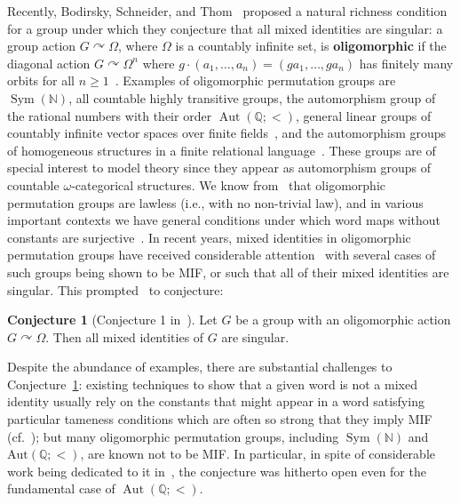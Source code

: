 \documentclass{article}
\theoremstyle{remark}
\theoremstyle{definition}
\newtheorem{conjecture}[theorem]{Conjecture}
\def\acts{\curvearrowright}
\newcommand{\remmic}[1]{\textcolor{orange}{MP: #1}}
\newcommand{\repau}[1]{\textcolor{ForestGreen}{PM: #1}}
\DeclareMathOperator{\Aut}{Aut}
\DeclareMathOperator{\Sym}{Sym}
\DeclareMathOperator{\GL}{GL}
\begin{document}
Recently, Bodirsky, Schneider, and Thom~\cite{bodirsky2024mixed} %
{proposed}
a natural richness condition for a group under which they conjecture that all mixed identities are singular: a {group action}
$G\acts\Omega$, where $\Omega$ is a countably infinite set, is \textbf{oligomorphic} if the diagonal action $G\acts \Omega^n$ where $g\cdot (a_1, \dots, a_n)=(g a_1, \dots, g a_n)$ has finitely many orbits for all $n\geq 1$~\cite{cameron2009oligomorphic}. Examples of oligomorphic permutation groups are $\Sym(\mathbb{N})$, all countable highly transitive groups, the automorphism group of the rational numbers with their order $\Aut(\mathbb{Q}; <)$, general linear groups of countably infinite vector spaces  %
over finite fields~\cite{evans1991small}, and the automorphism groups of homogeneous structures in a finite relational language~\cite{homogeneous}. These groups are of special interest to model theory since they appear as automorphism groups of countable $\omega$-categorical structures. %
We know from~\cite{macpherson1986groups} that oligomorphic permutation groups are lawless (i.e., with no non-trivial law), and in various important contexts we have general 
conditions
 under which word maps without constants are surjective~\cite{adeleke1994representation, mycielski1987representations, lyndon1990words, maroli1990representation}. {In recent years, mixed identities in oligomorphic permutation groups have} received considerable attention~\cite{hull2016transitivity, etedadialiabadi2021dense, ghadernezhad2019group, bradford2023non, bodirsky2024mixed} with several cases %
of such groups being shown to be MIF, or such that all of their mixed identities are singular. This  prompted~\cite{bodirsky2024mixed} to conjecture:
\begin{conjecture}[{Conjecture 1 in~\cite{bodirsky2024mixed}}]\label{conj1} Let $G$ be a group with an oligomorphic action $G\acts \Omega$. Then all mixed identities of $G$ are singular.
\end{conjecture}
Despite the abundance of examples, there are substantial challenges to Conjecture~\ref{conj1}: existing techniques to show that a given word is not a mixed identity usually rely on %
the constants that might appear in a word satisfying particular tameness conditions which are often %
so strong that they imply MIF (cf.~\cite{bodirsky2024mixed}); {but many oligomorphic permutation groups,} {including $\Sym(\mathbb{N})$ and $\mathrm{Aut}(\mathbb{Q}; <)$,  are known not to be MIF}. In particular, in spite of considerable work being dedicated to it in~\cite{bodirsky2024mixed}, the conjecture was hitherto open even for the fundamental case of $\Aut(\mathbb{Q}; <)$. 
\end{document}
